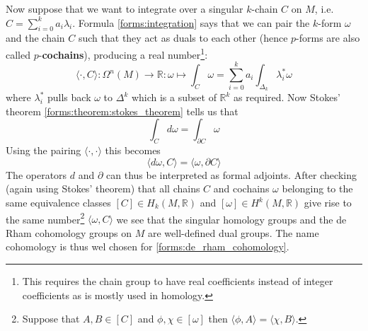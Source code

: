 	Now suppose that we want to integrate over a singular $k$-chain $C$ on $M$, i.e. $C = \sum_{i=0}^ka_i\lambda_i$. Formula \ref{forms:integration} says that we can pair the $k$-form $\omega$ and the chain $C$ such that they act as duals to each other (hence $p$-forms are also called $p$-\textbf{cochains}), producing a real number\footnote{This requires the chain group to have real coefficients instead of integer coefficients as is mostly used in homology.}:
	\begin{equation}
		\langle\cdot,C\rangle:\Omega^n(M)\rightarrow\mathbb{R}:\omega\mapsto\int_C\omega = \sum_{i=0}^ka_i\int_{\Delta_k}\lambda_i^{*}\omega
	\end{equation}
	where $\lambda_i^*$ pulls back $\omega$ to $\Delta^k$ which is a subset of $\mathbb{R}^k$ as required. Now Stokes' theorem \ref{forms:theorem:stokes_theorem} tells us that
	\begin{equation}
		\int_Cd\omega = \int_{\partial C}\omega
	\end{equation}
	Using the pairing $\langle\cdot,\cdot\rangle$ this becomes
	\begin{equation}
		\langle d\omega, C\rangle = \langle \omega, \partial C\rangle
	\end{equation}
	The operators $d$ and $\partial$ can thus be interpreted as formal adjoints. After checking (again using Stokes' theorem) that all chains $C$ and cochains $\omega$ belonging to the same equivalence classes $[C]\in H_k(M, \mathbb{R})$ and $[\omega]\in H^k(M, \mathbb{R})$ give rise to the same number\footnote{Suppose that $A, B\in [C]$ and $\phi, \chi\in[\omega]$ then $\langle \phi, A \rangle = \langle \chi, B \rangle$.} $\langle\omega, C\rangle$ we see that the singular homology groups and the de Rham cohomology groups on $M$ are well-defined dual groups. The name cohomology is thus wel chosen for \ref{forms:de_rham_cohomology}.
